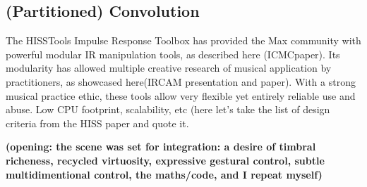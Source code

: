\subsection{(Partitioned) Convolution}

The HISSTools Impulse Response Toolbox has provided the Max community with powerful modular IR manipulation tools, as described here (ICMCpaper). Its modularity has allowed multiple creative research of musical application by practitioners, as showcased here(IRCAM presentation and paper). With a strong musical practice ethic, these tools allow very flexible yet entirely reliable use and abuse. Low CPU footprint, scalability, etc (here let's take the list of design criteria from the HISS paper and quote it.

\textbf{(opening: the scene was set for integration: a desire of timbral richeness, recycled virtuosity, expressive gestural control, subtle multidimentional control, the maths/code, and I repeat myself)}
